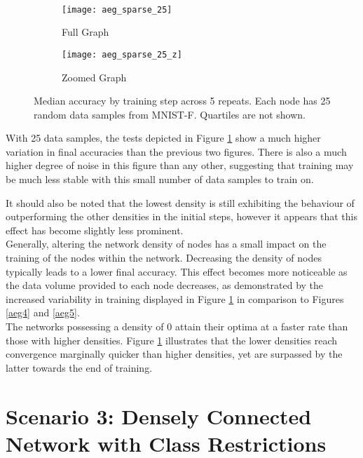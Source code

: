 \begin{figure}[H] 
	 \\
	\begin{subfigure}{0.49\textwidth}
		\texttt{[image: aeg\_sparse\_25]}
		\caption{Full Graph}
	\end{subfigure}
	\begin{subfigure}{0.49\textwidth}
		\texttt{[image: aeg\_sparse\_25\_z]}
		\caption{Zoomed Graph}
	\end{subfigure}
	\caption{Median accuracy by training step across 5 repeats. Each node has 25 random data samples from MNIST-F. Quartiles are not shown.}
	\label{aeg6}
\end{figure}

With 25 data samples, the tests depicted in Figure \ref{aeg6} show a much higher variation in final accuracies than the previous two figures. There is also a much higher degree of noise in this figure than any other, suggesting that training may be much less stable with this small number of data samples to train on.

It should also be noted that the lowest density is still exhibiting the behaviour of outperforming the other densities in the initial steps, however it appears that this effect has become slightly less prominent. \\


Generally, altering the network density of nodes has a small impact on the training of the nodes within the network. Decreasing the density of nodes typically leads to a lower final accuracy. This effect becomes more noticeable as the data volume provided to each node decreases, as demonstrated by the increased variability in training displayed in Figure \ref{aeg6} in comparison to Figures \ref{aeg4} and \ref{aeg5}. \\

The networks possessing a density of 0 attain their optima at a faster rate than those with higher densities. Figure \ref{aeg6} illustrates that the lower densities reach convergence marginally quicker than higher densities, yet are surpassed by the latter towards the end of training.

\section{Scenario 3: Densely Connected Network with Class Restrictions}

